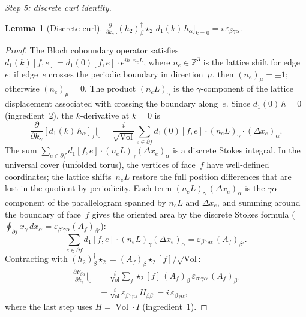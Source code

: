 \documentclass[preprint,12pt]{elsarticle}
\newtheorem{lemma}[theorem]{Lemma}
\DeclareMathOperator{\Vol}{Vol}
\begin{document}
\emph{Step 5: discrete curl identity.}

\begin{lemma}[Discrete curl]
\label{lem:curl}
$\displaystyle
  \frac{\partial}{\partial k_\gamma}
  \bigl[ (h_2)_\beta^\dagger \star_2\, d_1(k)\, h_\alpha \bigr]_{k=0}
  = i\, \varepsilon_{\beta\gamma\alpha}.
$
\end{lemma}

\begin{proof}
The Bloch coboundary operator satisfies
$d_1(k)[f,e] = d_1(0)[f,e] \cdot e^{i k \cdot n_e L}$,
where $n_e \in \mathbb{Z}^3$ is the lattice shift for edge~$e$: if
edge~$e$ crosses the periodic boundary in direction~$\mu$, then
$(n_e)_\mu = \pm 1$; otherwise $(n_e)_\mu = 0$. The product
$(n_e L)_\gamma$ is the $\gamma$-component of the lattice displacement
associated with crossing the boundary along~$e$.
Since $d_1(0)\, h = 0$ (ingredient~2), the $k$-derivative at $k = 0$ is
\begin{equation}
  \frac{\partial}{\partial k_\gamma} [d_1(k)\, h_\alpha]_f \bigg|_0
  = \frac{i}{\sqrt{\Vol}} \sum_{e \in \partial f}
    d_1(0)[f,e] \cdot (n_e L)_\gamma \cdot (\Delta x_e)_\alpha.
  \label{eq:curl_deriv}
\end{equation}
The sum $\sum_{e \in \partial f} d_1[f,e] \cdot (n_e L)_\gamma (\Delta x_e)_\alpha$
is a discrete Stokes integral. In the universal cover (unfolded torus),
the vertices of face~$f$ have well-defined coordinates; the lattice
shifts~$n_e L$ restore the full position differences that are lost in
the quotient by periodicity. Each term
$(n_e L)_\gamma\, (\Delta x_e)_\alpha$ is the $\gamma\alpha$-component of
the parallelogram spanned by $n_e L$ and $\Delta x_e$, and summing
around the boundary of face~$f$ gives the oriented area by the
discrete Stokes formula
($\oint_{\partial f} x_\gamma\, dx_\alpha
= \varepsilon_{\beta'\gamma\alpha} (A_f)_{\beta'}$):
\begin{equation}
  \sum_{e \in \partial f} d_1[f,e] \cdot (n_e L)_\gamma (\Delta x_e)_\alpha
  = \varepsilon_{\beta'\gamma\alpha}\, (A_f)_{\beta'}.
  \label{eq:stokes_face}
\end{equation}
Contracting with $(h_2)_\beta^\dagger \star_2
= (A_f)_\beta \star_2[f] / \sqrt{\Vol}$:
\begin{align}
  \frac{\partial F_{\beta\alpha}}{\partial k_\gamma}\bigg|_0
  &= \frac{i}{\Vol} \sum_f \star_2[f]\,
    (A_f)_\beta\, \varepsilon_{\beta'\gamma\alpha}\, (A_f)_{\beta'}
  \nonumber\\
  &= \frac{i}{\Vol}\, \varepsilon_{\beta'\gamma\alpha}\, H_{\beta\beta'}
  = i\, \varepsilon_{\beta\gamma\alpha},
  \label{eq:curl_result}
\end{align}
where the last step uses $H = \Vol \cdot I$ (ingredient~1).
\end{proof}
\end{document}
